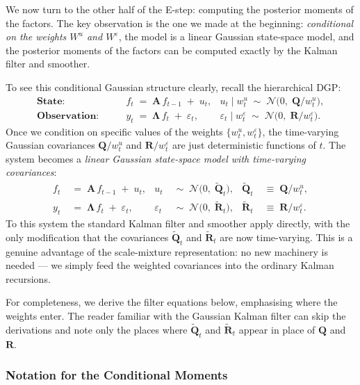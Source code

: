 \documentclass[11pt, a4paper, oneside]{article}
\newcommand{\mL}{\boldsymbol{\Lambda}}
\newcommand{\mA}{\mathbf{A}}
\newcommand{\mR}{\mathbf{R}}
\newcommand{\mQ}{\mathbf{Q}}
\begin{document}
We now turn to the other half of the E-step: computing the posterior
moments of the factors. The key observation is the one we made at the beginning: \emph{conditional on the
weights $W^u$ and $W^\varepsilon$}, the model is a linear Gaussian
state-space model, and the posterior moments of the factors can be
computed exactly by the Kalman filter and smoother.

To see this conditional Gaussian structure clearly, recall the
hierarchical DGP:
\begin{align*}
\textbf{State:}\qquad
& f_t \;=\; \mA\, f_{t-1} \;+\; u_t,
    & u_t \mid w^u_t \;\sim\; \mathcal{N}\!\big(0,\; \mQ / w^u_t\big), \\[2pt]
\textbf{Observation:}\qquad
& y_t \;=\; \mL\, f_t \;+\; \varepsilon_t,
    & \varepsilon_t \mid w^\varepsilon_t \;\sim\; \mathcal{N}\!\big(0,\; \mR / w^\varepsilon_t\big).
\end{align*}
Once we condition on specific values of the weights $\{w^u_t, w^\varepsilon_t\}$,
the time-varying Gaussian covariances $\mQ / w^u_t$ and
$\mR / w^\varepsilon_t$ are just deterministic functions of $t$. The
system becomes a \emph{linear Gaussian state-space model with
time-varying covariances}:
\begin{equation}
\begin{aligned}
f_t &\;=\; \mA\, f_{t-1} \;+\; u_t,
    & u_t &\;\sim\; \mathcal{N}\!\big(0,\; \tilde{\mQ}_t\big),
    & \tilde{\mQ}_t &\;\equiv\; \mQ / w^u_t, \\
y_t &\;=\; \mL\, f_t \;+\; \varepsilon_t,
    & \varepsilon_t &\;\sim\; \mathcal{N}\!\big(0,\; \tilde{\mR}_t\big),
    & \tilde{\mR}_t &\;\equiv\; \mR / w^\varepsilon_t.
\end{aligned}
\label{eq:kf-system}
\end{equation}
To this system the standard Kalman filter and smoother apply directly,
with the only modification that the covariances $\tilde{\mQ}_t$ and
$\tilde{\mR}_t$ are now time-varying. This is a genuine advantage of
the scale-mixture representation: no new machinery is needed — we
simply feed the weighted covariances into the ordinary Kalman
recursions.

For completeness, we derive the filter equations below, emphasising
where the weights enter. The reader familiar with the Gaussian Kalman
filter can skip the derivations and note only the places where
$\tilde{\mQ}_t$ and $\tilde{\mR}_t$ appear in place of $\mQ$ and $\mR$.

\subsubsection{Notation for the Conditional Moments}
\end{document}
